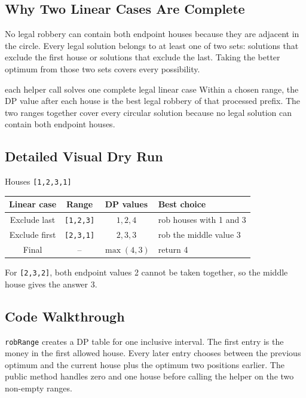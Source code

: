 \subsection{Why Two Linear Cases Are Complete}
No legal robbery can contain both endpoint houses because they are adjacent
in the circle. Every legal solution belongs to at least one of two
sets: solutions that exclude the first house or solutions that exclude the
last. Taking the better optimum from those two sets covers every possibility.

\begin{invariantbox}{each helper call solves one complete legal linear case}
Within a chosen range, the DP value after each house is the best legal robbery
of that processed prefix. The two ranges together cover every circular
solution because no legal solution can contain both endpoint houses.
\end{invariantbox}

\subsection{Detailed Visual Dry Run}
\begin{dryrunbox}{Houses \texttt{[1,2,3,1]}}
\begin{center}
\begin{tabularx}{\linewidth}{@{}c c c X@{}}
\toprule
Linear case & Range & DP values & Best choice \\
\midrule
Exclude last & \texttt{[1,2,3]} & \(1,2,4\) & rob houses with 1 and 3 \\
Exclude first & \texttt{[2,3,1]} & \(2,3,3\) & rob the middle value 3 \\
Final & -- & \(\max(4,3)\) & return 4 \\
\bottomrule
\end{tabularx}
\end{center}
For \texttt{[2,3,2]}, both endpoint values 2 cannot be taken together, so the
middle house gives the answer 3.
\end{dryrunbox}

\subsection{Code Walkthrough}
\texttt{robRange} creates a DP table for one inclusive interval. The first
entry is the money in the first allowed house. Every later entry chooses
between the previous optimum and the current house plus the optimum two
positions earlier. The public method handles zero and one house before calling
the helper on the two non-empty ranges.

